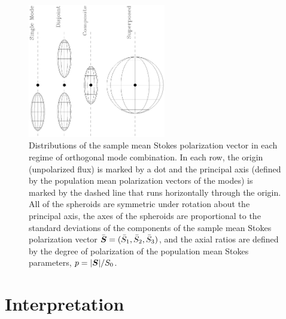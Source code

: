 \documentclass[twocolumn]{aastex6}
\newcommand{\mbf}[1]{\mbox{\boldmath $#1$}}
\begin{document}
%
\begin{figure}
\centerline{\includegraphics[angle=-90,width=60mm]{modes.eps}}
\caption{\label{fig:modes} Distributions of the sample mean Stokes
  polarization vector in each regime of orthogonal mode combination.
  In each row, the origin (unpolarized flux) is marked by a dot and
  the principal axis (defined by the population mean polarization
  vectors of the modes) is marked by the dashed line that runs
  horizontally through the origin.  All of the spheroids are symmetric
  under rotation about the principal axis, the axes of the spheroids
  are proportional to the standard deviations of the components of the
  sample mean Stokes polarization vector
  $\bar{\mbf{S}}=(\bar{S}_1,\bar{S}_2,\bar{S}_3)$, and the axial
  ratios are defined by the degree of polarization of the population
  mean Stokes parameters, $p=|\mbf{S}|/S_0$.}
\end{figure}
%



\section{Interpretation}
\label{sec:interpretation}
\end{document}
